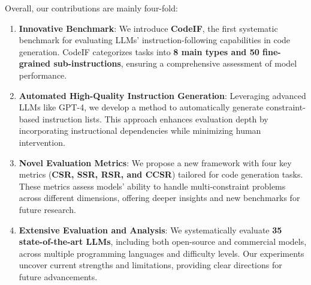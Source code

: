 Overall, our contributions are mainly four-fold:
\begin{enumerate}
    \item \textbf{Innovative Benchmark}: We introduce \textbf{CodeIF}, the first systematic benchmark for evaluating LLMs' instruction-following capabilities in code generation. CodeIF categorizes tasks into \textbf{8 main types and 50 fine-grained sub-instructions}, ensuring a comprehensive assessment of model performance.
    
    \item \textbf{Automated High-Quality Instruction Generation}: Leveraging advanced LLMs like GPT-4, we develop a method to automatically generate constraint-based instruction lists. This approach enhances evaluation depth by incorporating instructional dependencies while minimizing human intervention.
    
    \item \textbf{Novel Evaluation Metrics}: We propose a new framework with four key metrics (\textbf{CSR, SSR, RSR, and CCSR}) tailored for code generation tasks. These metrics assess models' ability to handle multi-constraint problems across different dimensions, offering deeper insights and new benchmarks for future research.
    
    \item \textbf{Extensive Evaluation and Analysis}: We systematically evaluate \textbf{35 state-of-the-art LLMs}, including both open-source and commercial models, across multiple programming languages and difficulty levels. Our experiments uncover current strengths and limitations, providing clear directions for future advancements.
\end{enumerate}





